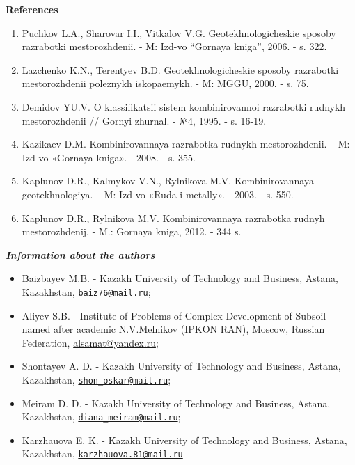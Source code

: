 {\bfseries References}

\begin{enumerate}
\item
Puchkov L.A., Sharovar I.I., Vitkalov V.G. Geotekhnologicheskie
sposoby razrabotki mestorozhdenii. - M: Izd-vo ``Gornaya kniga'',
2006. - s. 322.

\item
Lazchenko K.N., Terentyev B.D. Geotekhnologicheskie sposoby
razrabotki mestorozhdenii poleznykh iskopaemykh. - M: MGGU, 2000. - s.
75.

\item
Demidov YU.V. O klassifikatsii sistem kombinirovannoi razrabotki
rudnykh mestorozhdenii // Gornyi zhurnal. - №4, 1995. - s. 16-19.

\item
Kazikaev D.M. Kombinirovannaya razrabotka rudnykh mestorozhdenii. --
M: Izd-vo «Gornaya kniga». - 2008. - s. 355.

\item
Kaplunov D.R., Kalmykov V.N., Rylnikova M.V. Kombinirovannaya
geotekhnologiya. -- M: Izd-vo «Ruda i metally». - 2003. - s. 550.

\item
Kaplunov D.R., Rylnikova M.V. Kombinirovannaya razrabotka rudnyh
mestorozhdenij. - M.: Gornaya kniga, 2012. - 344 s.
\end{enumerate}

\emph{{\bfseries Information about the authors}}

\begin{itemize}
\item
Baizbayev M.B. - Kazakh University of Technology and Business, Astana,
Kazakhstan, \href{mailto:baiz76@mail.ru}{\nolinkurl{baiz76@mail.ru}};

\item
Aliyev S.B. - Institute of Problems of Complex Development of Subsoil
named after academic N.V.Melnikov (IPKON RAN), Moscow, Russian
Federation, \href{mailto:baiz76@mail.ru}{alsamat@yandex.ru};

\item
Shontayev A. D. - Kazakh University of Technology and Business, Astana,
Kazakhstan,
\href{mailto:shon_oskar@mail.ru}{\nolinkurl{shon\_oskar@mail.ru}};

\item
Meiram D. D. - Kazakh University of Technology and Business, Astana,
Kazakhstan,
\href{mailto:diana_meiram@mail.ru}{\nolinkurl{diana\_meiram@mail.ru}};

\item
Karzhauova E. K. - Kazakh University of Technology and Business, Astana,
Kazakhstan,
\href{mailto:karzhauova.81@mail.ru}{\nolinkurl{karzhauova.81@mail.ru}}
\end{itemize}

